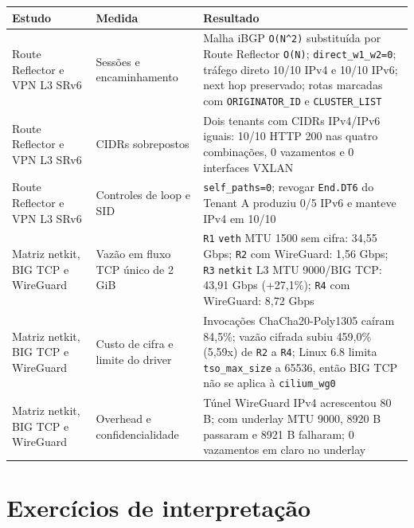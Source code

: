 \documentclass[12pt,openany,oneside,a4paper,chapter=TITLE,english,brazil]{abntex2}
\begin{document}
\begin{quadro}[!htbp]
\caption{Resultados de Route Reflector, SRv6 e WireGuard}
\footnotesize
\begin{tabularx}{\textwidth}{|>{\raggedright\arraybackslash\hsize=0.743\hsize}X|>{\raggedright\arraybackslash\hsize=0.732\hsize}X|>{\raggedright\arraybackslash\hsize=1.524\hsize}X|}
\hline
\textbf{Estudo} & \textbf{Medida} & \textbf{Resultado} \\
\hline
Route Reflector e VPN L3 SRv6 & Sessões e encaminhamento & Malha iBGP \texttt{O(\allowbreak{}N\textasciicircum{}2)} substituída por
Route Reflector \texttt{O(\allowbreak{}N)};
\texttt{direct\_\allowbreak{}w1\_\allowbreak{}w2=\allowbreak{}0};
tráfego direto 10/10 IPv4 e 10/10 IPv6; next hop preservado; rotas
marcadas com \texttt{ORIGINATOR\_\allowbreak{}ID} e
\texttt{CLUSTER\_\allowbreak{}LIST} \\
\hline
Route Reflector e VPN L3 SRv6 & CIDRs sobrepostos & Dois tenants com CIDRs IPv4/IPv6 iguais: 10/10 HTTP 200 nas quatro
combinações, 0 vazamentos e 0 interfaces VXLAN \\
\hline
Route Reflector e VPN L3 SRv6 & Controles de loop e SID & \texttt{self\_\allowbreak{}paths=\allowbreak{}0}; revogar
\texttt{End.\allowbreak{}DT6} do Tenant A produziu 0/5 IPv6 e manteve
IPv4 em 10/10 \\
\hline
Matriz netkit, BIG TCP e WireGuard & Vazão em fluxo TCP único de 2 GiB & \texttt{R1} \texttt{veth} MTU 1500 sem cifra: 34,55 Gbps; \texttt{R2}
com WireGuard: 1,56 Gbps; \texttt{R3} \texttt{netkit} L3 MTU 9000/BIG
TCP: 43,91 Gbps (+27,1\%); \texttt{R4} com WireGuard: 8,72 Gbps \\
\hline
Matriz netkit, BIG TCP e WireGuard & Custo de cifra e limite do driver & Invocações ChaCha20-Poly1305 caíram 84,5\%; vazão cifrada subiu 459,0\%
(5,59x) de \texttt{R2} a \texttt{R4}; Linux 6.8 limita
\texttt{tso\_\allowbreak{}max\_\allowbreak{}size} a 65536, então BIG TCP
não se aplica à \texttt{cilium\_\allowbreak{}wg0} \\
\hline
Matriz netkit, BIG TCP e WireGuard & Overhead e confidencialidade & Túnel WireGuard IPv4 acrescentou 80 B; com underlay MTU 9000, 8920 B
passaram e 8921 B falharam; 0 vazamentos em claro no underlay \\
\hline
\end{tabularx}
\end{quadro}

\section{Exercícios de interpretação}\label{exercuxedcios-de-interpretauxe7uxe3o-4}
\end{document}
